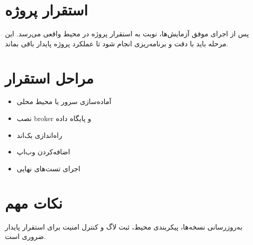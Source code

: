 \section{استقرار پروژه}

پس از اجرای موفق آزمایش‌ها، نوبت به استقرار پروژه در محیط واقعی می‌رسد. این مرحله باید با دقت و برنامه‌ریزی انجام شود تا عملکرد پروژه پایدار باقی بماند.

\section{مراحل استقرار}

\begin{itemize}
    \item آماده‌سازی سرور یا محیط محلی
    \item نصب broker و پایگاه داده
    \item راه‌اندازی بک‌اند
    \item اضافه‌کردن وب‌اپ
    \item اجرای تست‌های نهایی
\end{itemize}

\section{نکات مهم}

به‌روزرسانی نسخه‌ها، پیکربندی محیط، ثبت لاگ و کنترل امنیت برای استقرار پایدار ضروری است.
